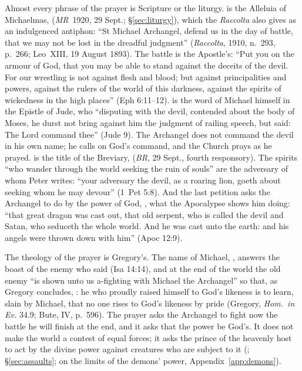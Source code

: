 Almost every phrase of the prayer is Scripture or the liturgy.  is the Alleluia of Michaelmas, 
(\emph{MR}~1920, 29 Sept.; \S\ref{sec:liturgy}), which the
\emph{Raccolta} also gives as an indulgenced antiphon: ``St Michael
Archangel, defend us in the day of battle, that we may not be lost in the
dreadful judgment'' (\emph{Raccolta}, 1910, n.~293, p.~266; Leo~XIII,
19 August 1893). The battle is the Apostle's: ``Put you on the armour of
God, that you may be able to stand against the deceits of the devil. For
our wrestling is not against flesh and blood; but against principalities
and powers, against the rulers of the world of this darkness, against the
spirits of wickedness in the high places'' (Eph 6:11--12).  is the word of Michael himself in the Epistle of Jude, who
``disputing with the devil, contended about the body of Moses, he durst
not bring against him the judgment of railing speech, but said: The Lord
command thee'' (Jude 9). The Archangel does not command the devil in his
own name; he calls on God's command, and the Church prays as he prayed.
 is the title of the Breviary,
 (\emph{BR}, 29 Sept., fourth
responsory). The spirits ``who wander through the world seeking the ruin
of souls'' are the adversary of whom Peter writes: ``your adversary the
devil, as a roaring lion, goeth about seeking whom he may devour'' (1~Pet
5:8). And the last petition asks the Archangel to do by the power of God,
, what the Apocalypse shows him doing: ``that great
dragon was cast out, that old serpent, who is called the devil and Satan,
who seduceth the whole world. And he was cast unto the earth: and his
angels were thrown down with him'' (Apoc 12:9).

The theology of the prayer is Gregory's. The name of Michael, , answers the boast of the enemy who said  (Isa 14:14), and at the end of the world the old enemy ``is
shown unto us a-fighting with Michael the Archangel'' so that, as Gregory
concludes, : he who proudly raised himself to God's likeness is to learn,
slain by Michael, that no one rises to God's likeness by pride (Gregory,
\emph{Hom.\ in Ev.} 34.9; Bute, IV, p.~596). The prayer asks the
Archangel to fight now the battle he will finish at the end, and it asks
that the power be God's. It does not make the world a contest of equal
forces; it asks the prince of the heavenly host to act by the divine
power against creatures who are subject to it (;
\S\ref{sec:assaults}; on the limits of the demons' power,
Appendix~\ref{app:demons}).

